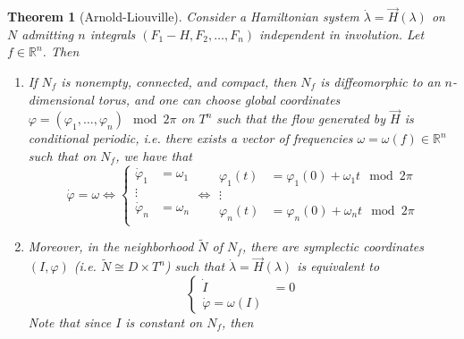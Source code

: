 \documentclass{article}
\newcommand{\R}{\mathbb R}
\newcommand{\vhi}{\varphi}
\newcommand{\w}{\omega}
\newtheorem{thm}{Theorem}
\begin{document}
\begin{thm}[Arnold-Liouville]
    Consider a Hamiltonian system $\dot\lambda = \vec H(\lambda)$ on $N$ admitting $n$ integrals $(F_1 - H, F_2,\dots,F_n)$ independent in involution. Let $f\in \R^n$. Then
    \begin{enumerate}
        \item If $N_f$ is nonempty, connected, and compact, then $N_f$ is diffeomorphic to an $n$-dimensional torus, and one can choose global coordinates $\vhi = (\vhi_1,\dots,\vhi_n) \mod 2\pi$ on $T^n$ such that the flow generated by $\vec H$ is conditional periodic, i.e. there exists a vector of frequencies $\w = \w(f)\in \R^n$ such that on $N_f$, we have that
        \[\dot\vhi=\w\Leftrightarrow\left\{\begin{aligned}
            \dot\vhi_1&=\w_1\\
            \vdots\\
            \dot\vhi_n&=\w_n\\
        \end{aligned}\right.\Leftrightarrow\begin{aligned}
            \vhi_1(t) & = \vhi_1(0) +\w_1 t \mod 2\pi\\
            \vdots\\
            \vhi_n(t) & = \vhi_n(0) +\w_n t \mod 2\pi
        \end{aligned}\]
        \item Moreover, in the neighborhood $\tilde N$ of $N_f$, there are symplectic coordinates $(I,\vhi)$ (i.e. $\tilde N\cong D\times T^n$) such that $\dot\lambda = \vec H(\lambda)$ is equivalent to
        \[\left\{\begin{aligned}
            \dot I&=0\\
            \dot \vhi = \w(I)
        \end{aligned}\right.\]
        Note that since $I$ is constant on $N_f$, then 
    \end{enumerate}
\end{thm}
\end{document}
